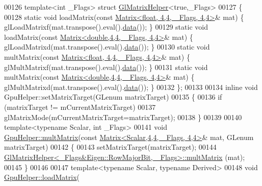 \begin{DoxyCode}
00126 \textcolor{keyword}{template}<\textcolor{keywordtype}{int} \_Flags> \textcolor{keyword}{struct }\hyperlink{struct_gl_matrix_helper}{GlMatrixHelper}<true,\_Flags>
00127 \{
00128     \textcolor{keyword}{static} \textcolor{keywordtype}{void} loadMatrix(\textcolor{keyword}{const} \hyperlink{group___core___module_class_eigen_1_1_matrix}{Matrix<float, 4,4, \_Flags, 4,4>}&  mat) \{ 
      glLoadMatrixf(mat.transpose().eval().\hyperlink{class_eigen_1_1_plain_object_base_ac25699535374b1854cf8494e44ad31b2}{data}()); \}
00129     \textcolor{keyword}{static} \textcolor{keywordtype}{void} loadMatrix(\textcolor{keyword}{const} \hyperlink{group___core___module_class_eigen_1_1_matrix}{Matrix<double,4,4, \_Flags, 4,4>}& mat) \{ 
      glLoadMatrixd(mat.transpose().eval().\hyperlink{class_eigen_1_1_plain_object_base_ac25699535374b1854cf8494e44ad31b2}{data}()); \}
00130     \textcolor{keyword}{static} \textcolor{keywordtype}{void} multMatrix(\textcolor{keyword}{const} \hyperlink{group___core___module_class_eigen_1_1_matrix}{Matrix<float, 4,4, \_Flags, 4,4>}&  mat) \{ 
      glMultMatrixf(mat.transpose().eval().\hyperlink{class_eigen_1_1_plain_object_base_ac25699535374b1854cf8494e44ad31b2}{data}()); \}
00131     \textcolor{keyword}{static} \textcolor{keywordtype}{void} multMatrix(\textcolor{keyword}{const} \hyperlink{group___core___module_class_eigen_1_1_matrix}{Matrix<double,4,4, \_Flags, 4,4>}& mat) \{ 
      glMultMatrixd(mat.transpose().eval().\hyperlink{class_eigen_1_1_plain_object_base_ac25699535374b1854cf8494e44ad31b2}{data}()); \}
00132 \};
00133 
00134 \textcolor{keyword}{inline} \textcolor{keywordtype}{void} GpuHelper::setMatrixTarget(GLenum matrixTarget)
00135 \{
00136     \textcolor{keywordflow}{if} (matrixTarget != mCurrentMatrixTarget)
00137         glMatrixMode(mCurrentMatrixTarget=matrixTarget);
00138 \}
00139 
00140 \textcolor{keyword}{template}<\textcolor{keyword}{typename} Scalar, \textcolor{keywordtype}{int} \_Flags>
00141 \textcolor{keywordtype}{void} \hyperlink{class_gpu_helper_a3abb45392e7dcf6450fa94bd345d9096}{GpuHelper::multMatrix}(\textcolor{keyword}{const} 
      \hyperlink{group___core___module_class_eigen_1_1_matrix}{Matrix<Scalar,4,4, \_Flags, 4,4>}& mat, GLenum matrixTarget)
00142 \{
00143     setMatrixTarget(matrixTarget);
00144     \hyperlink{struct_gl_matrix_helper}{GlMatrixHelper<\_Flags&Eigen::RowMajorBit, \_Flags>::multMatrix}
      (mat);
00145 \}
00146 
00147 \textcolor{keyword}{template}<\textcolor{keyword}{typename} Scalar, \textcolor{keyword}{typename} Derived>
00148 \textcolor{keywordtype}{void} \hyperlink{class_gpu_helper_a31ac77373dc54409648558d79d5a8c3e}{GpuHelper::loadMatrix}(

\end{DoxyCode}
